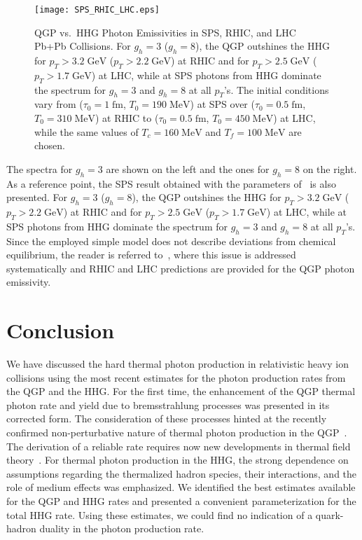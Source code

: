 \documentclass[12pt,twoside,fleqn]{article}
\newcommand{\figcaptionwidth}{15.cm}
\newcommand{\fm}{\mbox{fm}}
\newcommand{\MeV}{\mbox{MeV}}
\newcommand{\GeV}{\mbox{GeV}}
\begin{document}
\begin{figure}
  \texttt{[image: SPS\_RHIC\_LHC.eps]}
  \parbox{\figcaptionwidth}{\caption[QGP vs.\ HHG Photon Emissivities in SPS,
    RHIC, and LHC Pb+Pb Collisions] {QGP vs.\ HHG Photon Emissivities in SPS,
      RHIC, and LHC Pb+Pb Collisions. For $g_h=3$ ($g_h=8$), the QGP outshines
      the HHG for $p_T > 3.2\;\GeV$ ($p_T > 2.2\;\GeV$) at RHIC and for $p_T >
      2.5\;\GeV$ ($p_T > 1.7\;\GeV$) at LHC, while at SPS photons from HHG
      dominate the spectrum for $g_h=3$ and $g_h=8$ at all $p_T$'s. The initial
      conditions vary from ($\tau_0 = 1\;\fm$, $T_0 = 190\;\MeV$) at SPS over
      ($\tau_0 = 0.5\;\fm$, $T_0 = 310\;\MeV$) at RHIC to ($\tau_0 = 0.5\;\fm$,
      $T_0 = 450\;\MeV$) at LHC, while the same values of $T_c = 160\;\MeV$ and
      $T_f = 100\;\MeV$ are chosen.}}
\label{Fig_SPS_RHIC_LHC}
\end{figure} 
%
The spectra for $g_h = 3$ are shown on the left and the ones for $g_h = 8$ on
the right. As a reference point, the SPS result obtained with the parameters
of~\cite{SRIVASTAVA_1999} is also presented. For $g_h=3$ ($g_h=8$), the QGP
outshines the HHG for $p_T > 3.2\;\GeV$ ($p_T > 2.2\;\GeV$) at RHIC and for $p_T
> 2.5\;\GeV$ ($p_T > 1.7\;\GeV$) at LHC, while at SPS photons from HHG dominate
the spectrum for $g_h=3$ and $g_h=8$ at all $p_T$'s. Since the employed simple
model does not describe deviations from chemical equilibrium, the reader is
referred to~\cite{MUSTAFA_CNEQ_2000}, where this issue is addressed
systematically and RHIC and LHC predictions are provided for the QGP photon
emissivity.
%
\newpage
\section{Conclusion}
\label{Conclusion}
%
We have discussed the hard thermal photon production in relativistic heavy ion
collisions using the most recent estimates for the photon production rates from
the QGP and the HHG. For the first time, the enhancement of the QGP thermal
photon rate and yield due to bremsstrahlung processes was presented in its
corrected form. The consideration of these processes hinted at the recently
confirmed non-perturbative nature of thermal photon production in the
QGP~\cite{AURENCHE_2000}. The derivation of a reliable rate requires now new
developments in thermal field theory~\cite{AURENCHE_LPM_2000}.  For thermal
photon production in the HHG, the strong dependence on assumptions regarding the
thermalized hadron species, their interactions, and the role of medium effects
was emphasized. We identified the best estimates available for the QGP and HHG
rates and presented a convenient parameterization for the total HHG rate. Using
these estimates, we could find no indication of a quark-hadron duality in the
photon production rate.
\end{document}
